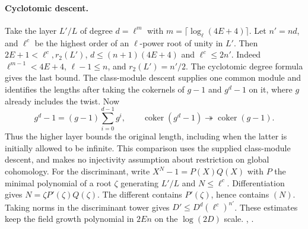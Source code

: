 \paragraph{Cyclotomic descent.}
Take the layer \(L'/L\) of degree \(d=\ell^m\) with \(m=\lceil\log_\ell(4E+4)\rceil\). Let \(n'=nd\), and \(\ell^c\) be the highest order of an \(\ell\)-power root of unity in \(L'\). Then \(2E+1<\ell^c,r_2(L')\), \(d\le(n+1)(4E+4)\) and \(\ell^c\le 2n'\). Indeed \(\ell^{m-1}<4E+4\), \(\ell-1\le n\), and \(r_2(L')=n'/2\). The cyclotomic degree formula gives the last bound. The class-module descent supplies one common module and identifies the lengths after taking the cokernels of \(g-1\) and \(g^d-1\) on it, where \(g\) already includes the twist. Now
\[
 g^d-1=(g-1)\sum_{i=0}^{d-1}g^i,\qquad
 \operatorname{coker}(g^d-1)\twoheadrightarrow\operatorname{coker}(g-1).
\]
Thus the higher layer bounds the original length, including when the latter is initially allowed to be infinite. This comparison uses the supplied class-module descent, and makes no injectivity assumption about restriction on global cohomology. For the discriminant, write \(X^N-1=P(X)Q(X)\) with \(P\) the minimal polynomial of a root \(\zeta\) generating \(L'/L\) and \(N\le\ell^c\). Differentiation gives \(N=\zeta P'(\zeta)Q(\zeta)\). The different contains \(P'(\zeta)\), hence contains \((N)\). Taking norms in the discriminant tower gives \(D'\le D^d(\ell^c)^{n'}\). These estimates keep the field growth polynomial in \(2En\) on the \(\log(2D)\) scale. 
,
.

